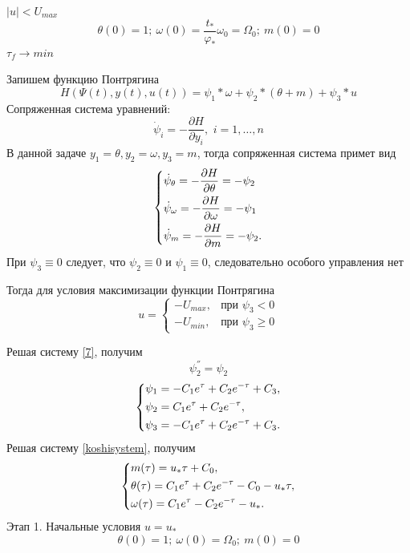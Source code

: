 \documentclass[a4paper,14pt]{article}
\theoremstyle{plain} %
\theoremstyle{definition} %
\theoremstyle{remark} %
\begin{document}
{$|u|<U_{max}$
\[
    \theta(0)=1;\ \omega(0)=\frac{t_\ast}{\varphi_\ast}\omega_0=\Omega_0;\ m(0)=0
\]
$\tau_f\to min$

Запишем функцию Понтрягина
\[
    H(\Psi(t),y(t),u(t))=\psi_1*\omega+\psi_2*(\theta+m)+\psi_3*u
\]
Сопряженная система уравнений:
\[
    \dot{\psi}_i  =  - \frac{{\partial H}}{{\partial y_i }},\,\,i = 1, \ldots ,n
\]
В данной задаче $y_1 = \theta, y_2 = \omega, y_3=m$, тогда сопряженная система примет вид
\begin{equation} \label{7}
    \left\{ {\begin{aligned}
                 & \dot \psi _\theta  =  - \frac{{\partial H}}{{\partial \theta}} = - \psi_2\hfill   \\
                 & \dot \psi _\omega   =  - \frac{{\partial H}}{{\partial \omega }} = - \psi_1\hfill \\
                 & \dot \psi _m   =  - \frac{{\partial H}}{{\partial m }} = - \psi_2 . \hfill        \\
            \end{aligned}} \right.
\end{equation}
При $\psi_3\equiv0$ следует, что $\psi_2\equiv0$ и $\psi_1\equiv0$, следовательно особого управления нет

Тогда для условия максимизации функции Понтрягина
\[
    u=
    \begin{cases}
        -U_{max}, & \text{при $\psi_3<0$}    \\
        -U_{min}, & \text{при $\psi_3\geq0$}
    \end{cases}
\]

Решая систему \eqref{7}, получим
\[
    \psi^{''}_2=\psi_2
\]
\begin{equation}\label{psisystem}
    \left\{ {\begin{aligned}
                 & \psi_1 = -C_1e^\tau+C_2e^{-\tau}+C_3, \hfill  \\
                 & \psi_2 = C_1e^\tau+C_2e^{-\tau} , \hfill      \\
                 & \psi_3 = -C_1e^\tau+C_2e^{-\tau}+C_3 . \hfill \\
            \end{aligned}} \right.
\end{equation}
Решая систему \eqref{koshisystem}, получим
\begin{equation}\label{solvekoshi}
    \left\{ {\begin{aligned}
                 & m(\tau) = u_*\tau+C_0, \hfill                              \\
                 & \theta(\tau) = C_1e^\tau+C_2e^{-\tau}-C_0-u_*\tau , \hfill \\
                 & \omega(\tau) = C_1e^\tau-C_2e^{-\tau}-u_*  . \hfill        \\
            \end{aligned}} \right.
\end{equation}
Этап 1. Начальные условия $u=u_*$
\[
    \theta(0)=1;\ \omega(0)=\Omega_0;\ m(0)=0
\]

}
\end{document}
